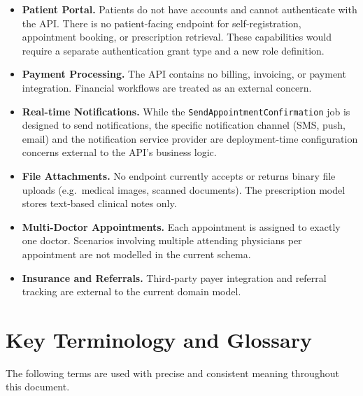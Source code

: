 \begin{itemize}
  \item \textbf{Patient Portal.} Patients do not have accounts and cannot
    authenticate with the API. There is no patient-facing endpoint for
    self-registration, appointment booking, or prescription retrieval.
    These capabilities would require a separate authentication grant
    type and a new role definition.
  \item \textbf{Payment Processing.} The API contains no billing,
    invoicing, or payment integration. Financial workflows are treated
    as an external concern.
  \item \textbf{Real-time Notifications.} While the
    \texttt{SendAppointmentConfirmation} job is designed to send
    notifications, the specific notification channel (SMS, push, email)
    and the notification service provider are deployment-time
    configuration concerns external to the API's business logic.
  \item \textbf{File Attachments.} No endpoint currently accepts or
    returns binary file uploads (e.g.\ medical images, scanned
    documents). The prescription model stores text-based clinical notes
    only.
  \item \textbf{Multi-Doctor Appointments.} Each appointment is assigned
    to exactly one doctor. Scenarios involving multiple attending
    physicians per appointment are not modelled in the current schema.
  \item \textbf{Insurance and Referrals.} Third-party payer integration
    and referral tracking are external to the current domain model.
\end{itemize}

\section{Key Terminology and Glossary}
\label{sec:glossary}

The following terms are used with precise and consistent meaning
throughout this document.

